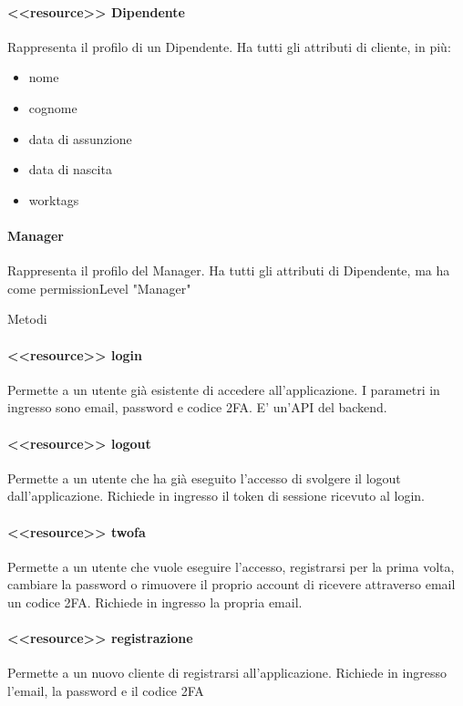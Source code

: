 \documentclass{report}
\begin{document}
\paragraph*{<<resource>> Dipendente}
Rappresenta il profilo di un Dipendente.
Ha tutti gli attributi di cliente, in più:
\begin{itemize}
	\item nome
	\item cognome
	\item data di assunzione
	\item data di nascita
	\item worktags
\end{itemize}
\paragraph*{Manager}
Rappresenta il profilo del Manager.
Ha tutti gli attributi di Dipendente, ma ha come permissionLevel "Manager"

Metodi
\paragraph{<<resource>> login}
Permette a un utente già esistente di accedere all'applicazione.
I parametri in ingresso sono email, password e codice 2FA.
E' un'API del backend.

\paragraph*{<<resource>> logout}
Permette a un utente che ha già eseguito l'accesso di svolgere il logout dall'applicazione.
Richiede in ingresso il token di sessione ricevuto al login.

\paragraph*{<<resource>> twofa}
Permette a un utente che vuole eseguire l'accesso, registrarsi per la prima volta, cambiare la password o rimuovere il proprio account di ricevere attraverso email un codice 2FA.
Richiede in ingresso la propria email.

\paragraph*{<<resource>> registrazione}
Permette a un nuovo cliente di registrarsi all'applicazione.
Richiede in ingresso l'email, la password e il codice 2FA
\end{document}
